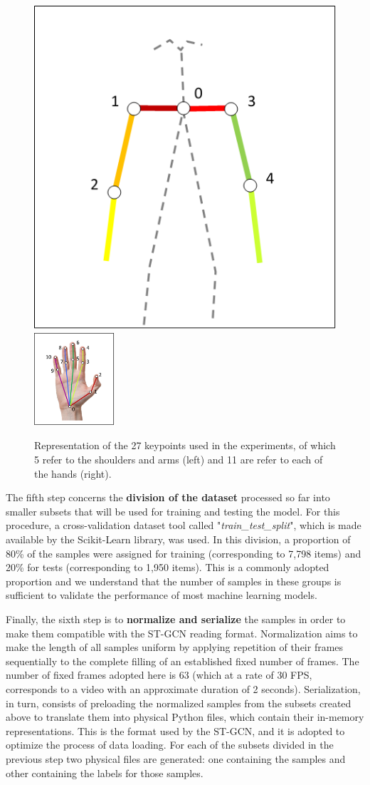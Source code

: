 \begin{figure}[ht]
    \centering
    \includegraphics[width=3.5
    cm]{images/filtered_keypoints_body}
    \includegraphics[width=3cm]{images/filtered_keypoints_hand}
    \caption{Representation of the 27 keypoints used in the experiments, of which 5 refer to the shoulders and arms (left) and 11 are refer to each of the hands (right).}
    \label{fig:filtered-keypoints}
\end{figure}


The fifth step concerns the \textbf{division of the dataset} processed so far into smaller subsets that will be used for training and testing the model. For this procedure, a cross-validation dataset tool called "\textit{train\_test\_split}", which is made available by the Scikit-Learn \cite{scikit-learn} library, was used. In this division, a proportion of 80\% of the samples were assigned for training (corresponding to 7,798 items) and 20\% for tests (corresponding to 1,950 items). This is a commonly adopted proportion and we understand that the number of samples in these groups is sufficient to validate the performance of most machine learning models.

Finally, the sixth step is to \textbf{normalize and serialize} the samples in order to make them compatible with the ST-GCN reading format. Normalization aims to make the length of all samples uniform by applying repetition of their frames sequentially to the complete filling of an established fixed number of frames. The number of fixed frames adopted here is 63 (which at a rate of 30 FPS, corresponds to a video with an approximate duration of 2 seconds). Serialization, in turn, consists of preloading the normalized samples from the subsets created above to translate them into physical Python \cite{python} files, which contain their in-memory representations. This is the format used by the ST-GCN, and it is adopted to optimize the process of data loading. For each of the subsets divided in the previous step two physical files are generated: one containing the samples and other containing the labels for those samples.

